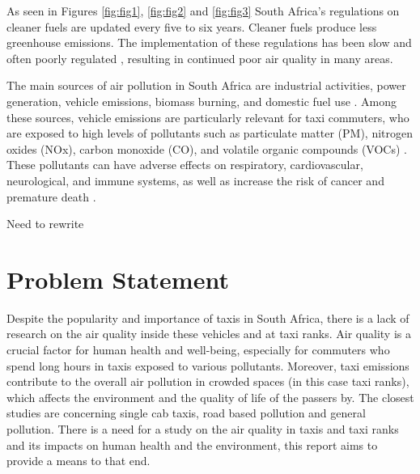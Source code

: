 \noindent
As seen in Figures \ref{fig:fig1}, \ref{fig:fig2} and \ref{fig:fig3} South Africa's regulations on cleaner fuels are updated every five to six years. Cleaner fuels produce less greenhouse emissions. The implementation of these regulations has been slow and often poorly regulated \cite{newcleanfuelstandards}, resulting in continued poor air quality in many areas.

\noindent
The main sources of air pollution in South Africa are industrial activities, power generation, vehicle emissions, biomass burning, and domestic fuel use \cite{Bylaws2023}. Among these sources, vehicle emissions are particularly relevant for taxi commuters, who are exposed to high levels of pollutants such as particulate matter (PM), nitrogen oxides (NOx), carbon monoxide (CO), and volatile organic compounds (VOCs) \cite{Venter2018}. These pollutants can have adverse effects on respiratory, cardiovascular, neurological, and immune systems, as well as increase the risk of cancer and premature death \cite{WHO2016}.


{\color{red} \huge Need to rewrite}
\section{Problem Statement}
Despite the popularity and importance of taxis in South Africa, there is a lack of research on the air quality inside these vehicles and at taxi ranks. 
Air quality is a crucial factor for human health and well-being, especially for commuters who spend long hours in taxis exposed to various pollutants.
Moreover, taxi emissions contribute to the overall air pollution in crowded spaces (in this case taxi ranks), which affects the environment and the quality of life of the passers by. The closest studies are concerning single cab taxis\cite{insidetaxismall}, road based pollution\cite{taxiNetwork} and general pollution\cite{Environmentalimpact}.
There is a need for a study on the air quality in taxis and taxi ranks and its impacts on human health and the environment, this report aims to provide a means to that end.

